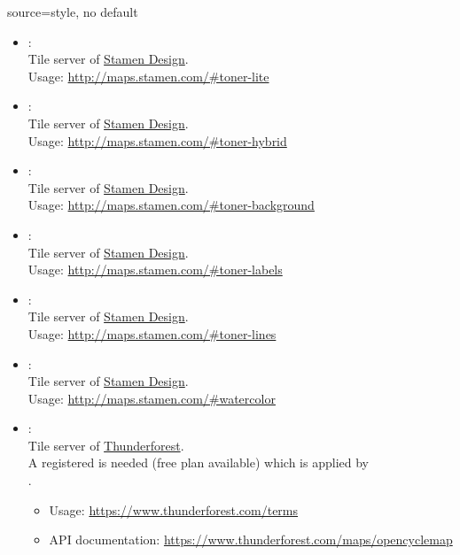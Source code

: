 \begin{docMrcKey}[supply]{source}{=}{style, no default}
\begin{itemize}
\clearpage
  \item{}:\\
    Tile server of \href{http://stamen.com}{Stamen Design}.\\
    Usage: \url{http://maps.stamen.com/#toner-lite}

  \item{}:\\
    Tile server of \href{http://stamen.com}{Stamen Design}.\\
    Usage: \url{http://maps.stamen.com/#toner-hybrid}

  \item{}:\\
    Tile server of \href{http://stamen.com}{Stamen Design}.\\
    Usage: \url{http://maps.stamen.com/#toner-background}

\clearpage
  \item{}:\\
    Tile server of \href{http://stamen.com}{Stamen Design}.\\
    Usage: \url{http://maps.stamen.com/#toner-labels}

  \item{}:\\
    Tile server of \href{http://stamen.com}{Stamen Design}.\\
    Usage: \url{http://maps.stamen.com/#toner-lines}

  \item{}:\\
    Tile server of \href{http://stamen.com}{Stamen Design}.\\
    Usage: \url{http://maps.stamen.com/#watercolor}

\clearpage
  \item{}:\\
    Tile server of \href{https://www.thunderforest.com}{Thunderforest}.\\
    A registered  is needed (free plan available)
    which is applied by\\
    .
    \begin{itemize}
    \item Usage: \url{https://www.thunderforest.com/terms}
    \item API documentation: \url{https://www.thunderforest.com/maps/opencyclemap}
    \end{itemize}


\end{itemize}
\end{docMrcKey}
